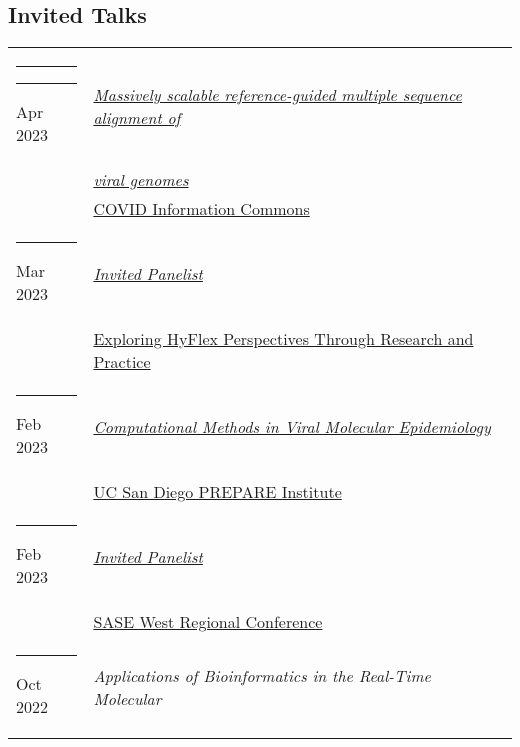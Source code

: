 \documentclass[margin,line]{res}
\begin{document}
\begin{resume}
\section{\sc Invited Talks}
\begin{longtable}{@{}p{0.7in}p{4in}}\rule{-1mm}{4.5mm}
\hspace*{-4mm} \rule{-1mm}{5mm} Apr 2023 & \href{https://www.youtube.com/live/3B59NtnJHrE?feature=share}{\textit{Massively scalable reference-guided multiple sequence alignment of}}\\*
\hspace*{-4mm} & \hspace{4mm} \href{https://www.youtube.com/live/3B59NtnJHrE?feature=share}{\textit{viral genomes}}\\*
\hspace*{-4mm} & \hspace{4mm} \href{https://covidinfocommons.datascience.columbia.edu/}{COVID Information Commons}\\
\hspace*{-4mm} \rule{-1mm}{5mm} Mar 2023 & \href{https://teaching.ucr.edu/deck/2023/03/09/exploring-hyflex-perspectives-through-research-and-practice-panel-discussion}{\textit{Invited Panelist}}\\*
\hspace*{-4mm} & \hspace{4mm} \href{https://teaching.ucr.edu/deck/2023/03/09/exploring-hyflex-perspectives-through-research-and-practice-panel-discussion}{Exploring HyFlex Perspectives Through Research and Practice}\\
\hspace*{-4mm} \rule{-1mm}{5mm} Feb 2023 & \href{https://youtu.be/IkSkQPXsXds}{\textit{Computational Methods in Viral Molecular Epidemiology}}\\*
\hspace*{-4mm} & \hspace{4mm} \href{https://prepare.ucsd.edu/}{UC San Diego PREPARE Institute}\\
\hspace*{-4mm} \rule{-1mm}{5mm} Feb 2023 & \href{https://www.saseconnect.org/regional-conferences}{\textit{Invited Panelist}}\\*
\hspace*{-4mm} & \hspace{4mm} \href{https://www.saseconnect.org/regional-conferences}{SASE West Regional Conference}\\
\hspace*{-4mm} \rule{-1mm}{5mm} Oct 2022 & \textit{Applications of Bioinformatics in the Real-Time Molecular}\\*

\end{longtable}
\end{resume}
\end{document}
